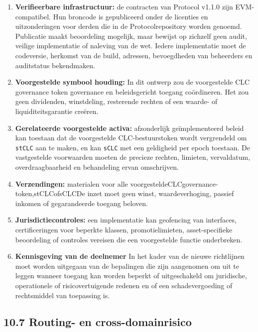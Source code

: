 \documentclass[11pt]{article}
\begin{document}
\begin{enumerate}[leftmargin=*]
\item \textbf{Verifieerbare infrastructuur:} de contracten van Protocol v1.1.0 zijn EVM-compatibel. Hun broncode is gepubliceerd onder de licenties en uitzonderingen voor derden die in de Protocolrepository worden genoemd. Publicatie maakt beoordeling mogelijk, maar bewijst op zichzelf geen audit, veilige implementatie of naleving van de wet. Iedere implementatie moet de codeversie, herkomst van de build, adressen, bevoegdheden van beheerders en auditstatus bekendmaken.
\item \textbf{Voorgestelde symbool houding:} In dit ontwerp zou de voorgestelde CLC governance token governance en beleidsgericht toegang coördineren. Het zou geen dividenden, winstdeling, resterende rechten of een waarde- of liquiditeitsgarantie creëren.
\item \textbf{Gerelateerde voorgestelde activa:} afzonderlijk geïmplementeerd beleid kan toestaan dat de voorgestelde CLC-bestuurstoken wordt vergrendeld om \texttt{stCLC} aan te maken, en kan \texttt{sCLC} met een geldigheid per epoch toestaan. De vastgestelde voorwaarden moeten de precieze rechten, limieten, vervaldatum, overdraagbaarheid en behandeling ervan omschrijven.
\item \textbf{Verzendingen:} materialen voor alle voorgesteldeCLCgovernance-token,stCLCofsCLCDe inzet moet geen winst, waardeverhoging, passief inkomen of gegarandeerde toegang beloven.
\item \textbf{Jurisdictiecontroles:} een implementatie kan geofencing van interfaces, certificeringen voor beperkte klassen, promotielimieten, asset-specifieke beoordeling of controles vereisen die een voorgestelde functie onderbreken.
\item \textbf{Kennisgeving van de deelnemer} In het kader van de nieuwe richtlijnen moet worden uitgegaan van de bepalingen die zijn aangenomen om uit te leggen wanneer toegang kan worden beperkt of uitgeschakeld om juridische, operationele of risicovertuigende redenen en of een schadevergoeding of rechtsmiddel van toepassing is.
\end{enumerate}
\subsection*{10.7 Routing- en cross-domainrisico}
\end{document}
